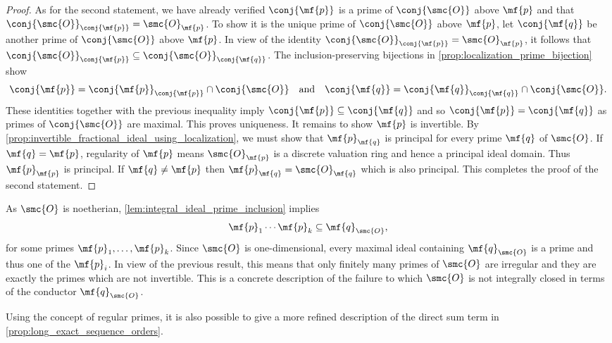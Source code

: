 \documentclass[12pt]{article}
\begin{document}
\begin{proof}
        As for the second statement, we have already verified \(\conj{\mf{p}}\) is a prime of \(\conj{\smc{O}}\) above \(\mf{p}\) and that \(\conj{\smc{O}}_{\conj{\mf{p}}} = \smc{O}_{\mf{p}}\). To show it is the unique prime of \(\conj{\smc{O}}\) above \(\mf{p}\), let \(\conj{\mf{q}}\) be another prime of \(\conj{\smc{O}}\) above \(\mf{p}\). In view of the identity \(\conj{\smc{O}}_{\conj{\mf{p}}} = \smc{O}_{\mf{p}}\), it follows that \(\conj{\smc{O}}_{\conj{\mf{p}}} \subseteq \conj{\smc{O}}_{\conj{\mf{q}}}\). The inclusion-preserving bijections in \cref{prop:localization_prime_bijection} show 
        \[
          \conj{\mf{p}} = \conj{\mf{p}}_{\conj{\mf{p}}} \cap \conj{\smc{O}} \quad \text{and} \quad \conj{\mf{q}} = \conj{\mf{q}}_{\conj{\mf{q}}} \cap \conj{\smc{O}}.
        \]
        These identities together with the previous inequality imply \(\conj{\mf{p}} \subseteq \conj{\mf{q}}\) and so \(\conj{\mf{p}} = \conj{\mf{q}}\) as primes of \(\conj{\smc{O}}\) are maximal. This proves uniqueness. It remains to show \(\mf{p}\) is invertible. By \cref{prop:invertible_fractional_ideal_using_localization}, we must show that \(\mf{p}_{\mf{q}}\) is principal for every prime \(\mf{q}\) of \(\smc{O}\). If \(\mf{q} = \mf{p}\), regularity of \(\mf{p}\) means \(\smc{O}_{\mf{p}}\) is a discrete valuation ring and hence a principal ideal domain. Thus \(\mf{p}_{\mf{p}}\) is principal. If \(\mf{q} \neq \mf{p}\) then \(\mf{p}_{\mf{q}} = \smc{O}_{\mf{q}}\) which is also principal. This completes the proof of the second statement.
      \end{proof}

      As \(\smc{O}\) is noetherian, \cref{lem:integral_ideal_prime_inclusion} implies
      \[
        \mf{p}_{1} \cdots \mf{p}_{k} \subseteq \mf{q}_{\smc{O}},
      \]
      for some primes \(\mf{p}_{1},\ldots,\mf{p}_{k}\). Since \(\smc{O}\) is one-dimensional, every maximal ideal containing \(\mf{q}_{\smc{O}}\) is a prime and thus one of the \(\mf{p}_{i}\). In view of the previous result, this means that only finitely many primes of \(\smc{O}\) are irregular and they are exactly the primes which are not invertible. This is a concrete description of the failure to which \(\smc{O}\) is not integrally closed in terms of the conductor \(\mf{q}_{\smc{O}}\).

      Using the concept of regular primes, it is also possible to give a more refined description of the direct sum term in \cref{prop:long_exact_sequence_orders}.
\end{document}
